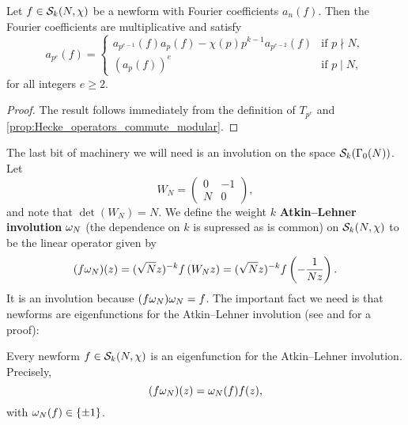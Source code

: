       \begin{proposition}\label{prop:newform_Fourier_coefficient_recurrence}
        Let $f \in \mathcal{S}_{k}(N,\chi)$ be a newform with Fourier coefficients $a_{n}(f)$. Then the Fourier coefficients are multiplicative and satisfy
        \[
          a_{p^{e}}(f) = \begin{cases} a_{p^{e-1}}(f)a_{p}(f)-\chi(p)p^{k-1}a_{p^{e-2}}(f) & \text{if $p \nmid N$}, \\ (a_{p}(f))^{e} & \text{if $p \mid N$}, \end{cases}
        \]
        for all integers $e \ge 2$.
      \end{proposition}
      \begin{proof}
        The result follows immediately from the definition of $T_{p^{e}}$ and \cref{prop:Hecke_operators_commute_modular}.
      \end{proof}
      
      The last bit of machinery we will need is an involution on the space $\mathcal{S}_{k}(\Gamma_{0}(N))$. Let
      \[
        W_{N} = \begin{pmatrix} 0 & -1 \\ N & 0 \end{pmatrix},
      \]
      and note that $\det(W_{N}) = N$. We define the weight $k$ \textbf{Atkin–Lehner involution} $\omega_{N}$ (the dependence on $k$ is supressed as is common) on $\mathcal{S}_{k}(N,\chi)$ to be the linear operator given by
      \[
        (f\omega_{N})(z) = (\sqrt{N}z)^{-k}f\left(W_{N}z\right) = (\sqrt{N}z)^{-k}f\left(-\frac{1}{Nz}\right).
      \]
      It is an involution because $(f\omega_{N})\omega_{N} = f$. The important fact we need is that newforms are eigenfunctions for the Atkin–Lehner involution (see \cite{miyake1989modular} and \cite{diamond2005first} for a proof):

      \begin{proposition}\label{prop:Atkin_Lehner_involution_preserves_subspaces}
        Every newform $f \in \mathcal{S}_{k}(N,\chi)$ is an eigenfunction for the Atkin–Lehner involution. Precisely,
        \[
          (f\omega_{N})(z) = \omega_{N}(f)f(z),
        \]
        with $\omega_{N}(f) \in \{\pm1\}$.
      \end{proposition}
